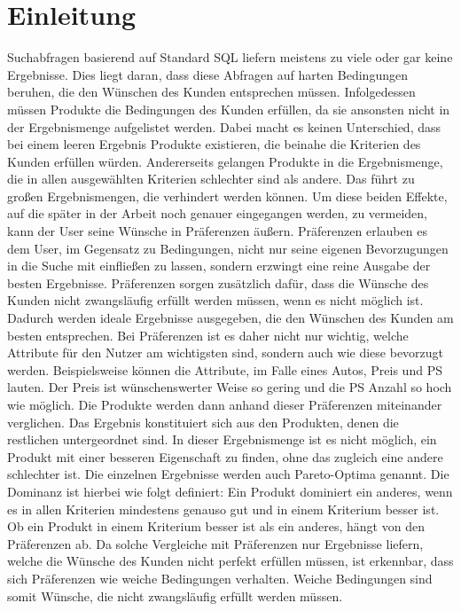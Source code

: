 \chapter{Einleitung}
\label{ch:Einleitung}
Suchabfragen basierend auf Standard SQL liefern meistens zu viele oder gar keine Ergebnisse.  Dies liegt daran, dass diese Abfragen auf harten Bedingungen beruhen, die den Wünschen des Kunden entsprechen müssen. Infolgedessen müssen Produkte die Bedingungen des Kunden erfüllen, da sie ansonsten nicht in der Ergebnismenge aufgelistet werden. Dabei macht es keinen Unterschied, dass bei einem leeren Ergebnis Produkte existieren, die beinahe die Kriterien des Kunden erfüllen würden. Andererseits gelangen Produkte in die Ergebnismenge, die in allen ausgewählten Kriterien schlechter sind als andere. Das führt zu großen Ergebnismengen, die verhindert werden können. Um diese beiden Effekte, auf die später in der Arbeit noch genauer eingegangen werden, zu vermeiden, kann der User seine Wünsche in Präferenzen äußern. Präferenzen erlauben es dem User, im Gegensatz zu Bedingungen, nicht nur seine eigenen Bevorzugungen in die Suche mit einfließen zu lassen, sondern erzwingt eine reine Ausgabe der besten Ergebnisse. Präferenzen sorgen zusätzlich dafür, dass die Wünsche des Kunden nicht zwangsläufig erfüllt werden müssen, wenn es nicht möglich ist. Dadurch werden ideale Ergebnisse ausgegeben, die den Wünschen des Kunden am besten entsprechen.
Bei Präferenzen ist es daher nicht nur wichtig, welche Attribute für den Nutzer am wichtigsten sind, sondern auch wie diese bevorzugt werden. Beispielsweise können die Attribute, im Falle eines Autos, Preis und PS lauten. Der Preis ist wünschenswerter Weise so gering und die PS Anzahl so hoch wie möglich.
Die Produkte werden dann anhand dieser Präferenzen miteinander verglichen. Das Ergebnis konstituiert sich aus den  Produkten, denen die restlichen untergeordnet sind. In dieser Ergebnismenge ist es nicht möglich, ein Produkt mit einer besseren Eigenschaft zu finden, ohne das zugleich eine andere schlechter ist. Die einzelnen Ergebnisse werden auch Pareto-Optima genannt. Die Dominanz ist hierbei wie folgt definiert: Ein Produkt dominiert ein anderes, wenn es in allen Kriterien mindestens genauso gut und in einem Kriterium besser ist. Ob ein Produkt in einem Kriterium besser ist als ein anderes, hängt von den Präferenzen ab. Da solche Vergleiche mit Präferenzen nur Ergebnisse liefern, welche die Wünsche des Kunden nicht perfekt erfüllen müssen, ist erkennbar, dass sich Präferenzen wie weiche Bedingungen verhalten. Weiche Bedingungen sind somit Wünsche, die nicht zwangsläufig erfüllt werden müssen.
